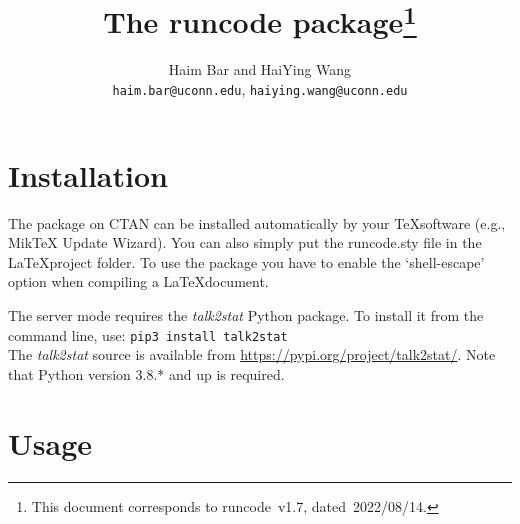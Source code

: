 \documentclass{ltxdoc}
\begin{document}
    \title{The \textsf{runcode} package\thanks{This document  corresponds to \textsf{runcode}~v1.7, dated~2022/08/14.}}
    \author{Haim Bar and HaiYing Wang \\ \texttt{haim.bar@uconn.edu}, \texttt{haiying.wang@uconn.edu}}
    \maketitle


\section{Installation}
The package on CTAN can be installed automatically by your \TeX\space software (e.g., MikTeX Update Wizard). You can also simply put the runcode.sty file in the \LaTeX\space project folder. To use the package you have to enable the `shell-escape' option when compiling a \LaTeX\space document.
	
The server mode requires the \textit{talk2stat} Python package. To install it from the command line, use:
\verb|pip3 install talk2stat|\\
The \textit{talk2stat} source is available from \url{https://pypi.org/project/talk2stat/}.
Note that Python version 3.8.* and up is required.

\section{Usage}
\end{document}
